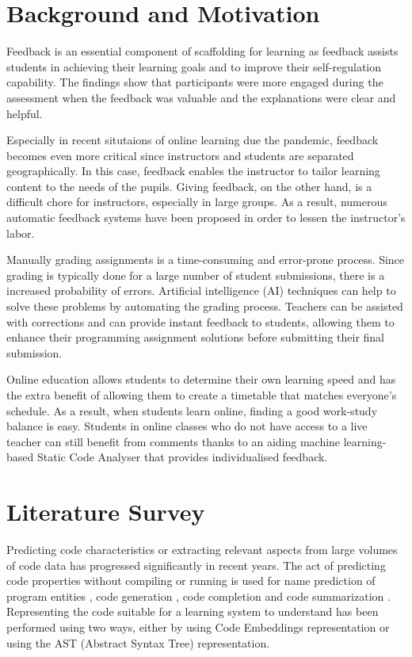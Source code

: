 \documentclass[conference]{IEEEtran}
\begin{document}
\section{Background and Motivation}
Feedback is an essential component of scaffolding for learning as
feedback assists students in achieving their learning goals and to
improve their self-regulation capability. The findings show that
participants were more engaged during the assessment when the feedback
was valuable and the explanations were clear and helpful.

Especially in recent situtaions of online learning due the pandemic,
feedback becomes even more critical since instructors and students are
separated geographically. In this case, feedback enables the
instructor to tailor learning content to the needs of the
pupils. Giving feedback, on the other hand, is a difficult chore for
instructors, especially in large groups. As a result, numerous
automatic feedback systems have been proposed in order to lessen the
instructor's labor.

Manually grading assignments is a time-consuming and error-prone process. Since grading is typically done for a large number of student submissions, there is a increased probability of errors. Artificial intelligence (AI) techniques can help to solve these problems by automating the grading process. Teachers can be assisted with corrections and can provide instant feedback to students, allowing them to enhance their programming assignment solutions before submitting their final submission.

Online education allows students to determine their own learning speed and has the extra benefit of allowing them to create a timetable that matches everyone's schedule. As a result, when students learn online, finding a good work-study balance is easy. Students in online classes who do not have access to a live teacher can still benefit from comments thanks to an aiding machine learning-based Static Code Analyser that provides individualised feedback.
    

\section{Literature Survey}

Predicting code characteristics or extracting relevant aspects from large volumes of code data has progressed significantly in recent years. The act of predicting code properties without compiling or running is used for name prediction of program entities \cite{I}, code generation \cite{J}, code completion \cite{K} and code summarization \cite{L}. Representing the code suitable for a learning system to understand has been performed using two ways, either by using Code Embeddings representation or using the AST (Abstract Syntax Tree) representation. 
\end{document}
